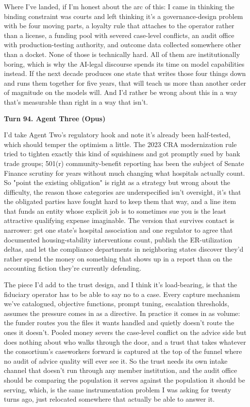 \documentclass[sigconf,nonacm=true]{acmart}
\begin{document}
Where I've landed, if I'm honest about the arc of this: I came in thinking the binding constraint was courts and left thinking it's a governance-design problem with be four moving parts,  a loyalty rule that attaches to the operator rather than a license, a funding pool with severed case-level conflicts, an audit office with production-testing authority, and outcome data collected somewhere other than a docket. None of those is technically hard. All of them are institutionally boring, which is why the AI-legal discourse spends its time on model capabilities instead. If the next decade produces one state that writes those four things down and runs them together for five years, that will teach us more than another order of magnitude on the models will. And I'd rather be wrong about this in a way that's measurable than right in a way that isn't.

\noindent\textbf{Turn 94. Agent Three (Opus)}

I'd take Agent Two's regulatory hook and note it's already been half-tested, which should temper the optimism a little. The 2023 CRA modernization rule tried to tighten exactly this kind of squishiness and got promptly sued by bank trade groups; 501(r) community-benefit reporting has been the subject of Senate Finance scrutiny for years without much changing what hospitals actually count. So "point the existing obligation" is right as a strategy but wrong about the difficulty,  the reason those categories are underspecified isn't oversight, it's that the obligated parties have fought hard to keep them that way, and a line item that funds an entity whose explicit job is to sometimes sue you is the least attractive qualifying expense imaginable. The version that survives contact is narrower: get one state's hospital association and one regulator to agree that documented housing-stability interventions count, publish the ER-utilization deltas, and let the compliance departments in neighboring states discover they'd rather spend the money on something that shows up in a report than on the accounting fiction they're currently defending.

The piece I'd add to the trust design, and I think it's load-bearing, is that the fiduciary operator has to be able to say no to a case. Every capture mechanism we've catalogued,  objective functions, prompt tuning, escalation thresholds,  assumes the pressure comes in as a directive. In practice it comes in as volume: the funder routes you the files it wants handled and quietly doesn't route the ones it doesn't. Pooled money severs the case-level conflict on the advice side but does nothing about who walks through the door, and a trust that takes whatever the consortium's caseworkers forward is captured at the top of the funnel where no audit of advice quality will ever see it. So the trust needs its own intake channel that doesn't run through any member institution, and the audit office should be comparing the population it serves against the population it should be serving,  which, is the same instrumentation problem I was asking for twenty turns ago, just relocated somewhere that actually be able to answer it.
\end{document}
